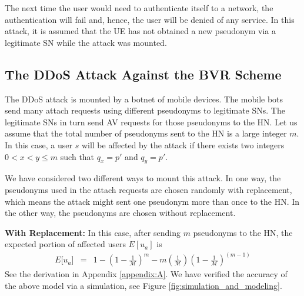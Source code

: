 \documentclass{llncs} %
\begin{document}
The next time the user would need to authenticate itself to a network, the authentication will fail and, hence, the user will be denied of any service. In this attack, it is assumed that the UE has not obtained a new pseudonym via a legitimate SN while the attack was mounted.

\subsection{The DDoS Attack Against the BVR Scheme} \label{sec:ddos_attack}
The DDoS attack is mounted by a botnet of mobile devices. The mobile bots send many attach requests using different pseudonyms to legitimate SNs. The legitimate SNs in turn send AV requests for those pseudonyms to the HN. Let us assume that the total number of pseudonyms sent to the HN is a large integer $m$. In this case, a user $s$ will be affected by the attack if there exists two integers $0 < x < y \leq m$ such that $q_{x} = p'$ and $q_{y} = p'$. 


We have considered two different ways to mount this attack. In one way, the pseudonyms used in the attach requests are chosen randomly with replacement, which means the attack might sent one pseudonym more than once to the HN. In the other way, the pseudonyms are chosen without replacement.

\textbf{With Replacement:} In this case, after sending $m$ pseudonyms to the HN, the expected portion of affected users $E[u_a]$ is
\begin{eqnarray}
E\big[ u_a \big] &=& 1- \left(1 - \frac{1}{\mathcal{M}}\right)^m - m\left(\frac{1}{\mathcal{M}}\right)\left(1 - \frac{1}{\mathcal{M}}\right)^{\left(m-1 \right)} \label{eqn:avg_with_replacement}
\end{eqnarray} 
See the derivation in Appendix \ref{appendix:A}. We have verified the accuracy of the above model via a simulation, see Figure \ref{fig:simulation_and_modeling}.
\end{document}
